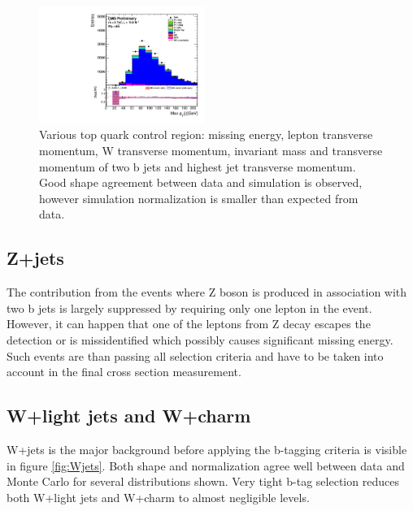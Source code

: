 \begin{figure}[htbp]
		\includegraphics[width=0.48\textwidth]{Figures/Results/Muon/prefit/TT_max_hJet_pt_doQCD1.pdf}		
	\caption[Top quark control region]{Various top quark control region: missing energy, lepton transverse momentum, W transverse momentum, invariant mass and transverse momentum of two b jets and highest jet transverse momentum. Good shape agreement between data and simulation is observed, however simulation normalization is smaller than expected from data.}
	\label{fig:TT_CR}
\end{figure}

\subsection{Z+jets}

The contribution from the events where Z boson is produced in association with two b jets is largely suppressed by requiring only one lepton in the event. However, it can happen that one of the leptons from Z decay escapes the detection or is missidentified which possibly causes significant missing energy. Such events are than passing all selection criteria and have to be taken into account in the final cross section measurement. 

\subsection{W+light jets and W+charm}

W+jets is the major background before applying the b-tagging criteria is visible in figure \ref{fig:Wjets}. Both shape and normalization agree well between data and Monte Carlo for several distributions shown. Very tight b-tag selection reduces both W+light jets and W+charm to almost negligible levels.  

